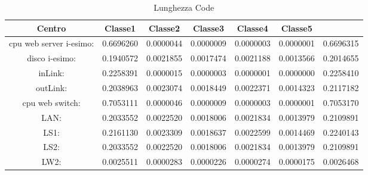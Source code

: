 \begin{table}[H]
\begin{center}\begin{scriptsize}
\begin{tabular}{||c|c|c|c|c|c||}
\hline
Centro &Classe1 &Classe2 &Classe3 &Classe4 &Classe5\\
\hline
\hline
 cpu web server i-esimo: 	&0.6696260	&0.0000044	&0.0000009	&0.0000003	&0.0000001	&0.6696315	\\\hline
 disco i-esimo: 	&0.1940572	&0.0021855	&0.0017474	&0.0021188	&0.0013566	&0.2014655	\\\hline
 inLink: 	&0.2258391	&0.0000015	&0.0000003	&0.0000001	&0.0000000	&0.2258410	\\\hline
 outLink: 	&0.2038963	&0.0023074	&0.0018449	&0.0022371	&0.0014323	&0.2117182	\\\hline
 cpu web switch: 	&0.7053111	&0.0000046	&0.0000009	&0.0000003	&0.0000001	&0.7053170	\\\hline
 LAN: 	&0.2033552	&0.0022520	&0.0018006	&0.0021834	&0.0013979	&0.2109891	\\\hline
 LS1: 	&0.2161130	&0.0023309	&0.0018637	&0.0022599	&0.0014469	&0.2240143	\\\hline
 LS2: 	&0.2033552	&0.0022520	&0.0018006	&0.0021834	&0.0013979	&0.2109891	\\\hline
 LW2: 	&0.0025511	&0.0000283	&0.0000226	&0.0000274	&0.0000175	&0.0026468	\\\hline
\end{tabular}
\end{scriptsize}\end{center}
\caption{Lunghezza Code}
\label{lunghezzacode}
\end{table}

